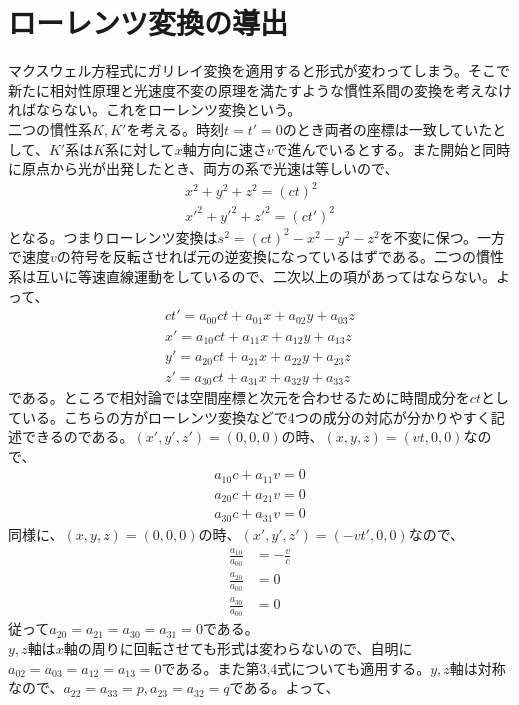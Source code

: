     \section{ローレンツ変換の導出}
        マクスウェル方程式にガリレイ変換を適用すると形式が変わってしまう。そこで新たに相対性原理と光速度不変の原理を満たすような慣性系間の変換を考えなければならない。これをローレンツ変換という。\\
        二つの慣性系$K,K'$を考える。時刻$t=t'=0$のとき両者の座標は一致していたとして、$K'$系は$K$系に対して$x$軸方向に速さ$v$で進んでいるとする。また開始と同時に原点から光が出発したとき、両方の系で光速は等しいので、
        \begin{align*}
            x^2+y^2+z^2 = (ct)^2\\
            x'^2+y'^2+z'^2 = (ct')^2
        \end{align*}
        となる。つまりローレンツ変換は$s^2=(ct)^2-x^2-y^2-z^2$を不変に保つ。一方で速度$v$の符号を反転させれば元の逆変換になっているはずである。二つの慣性系は互いに等速直線運動をしているので、二次以上の項があってはならない。よって、
        \begin{align*}
            ct' = a_{00}ct + a_{01}x + a_{02}y + a_{03}z\\
            x' = a_{10}ct + a_{11}x + a_{12}y + a_{13}z\\
            y' = a_{20}ct + a_{21}x + a_{22}y + a_{23}z\\
            z' = a_{30}ct + a_{31}x + a_{32}y + a_{33}z
        \end{align*}
        である。ところで相対論では空間座標と次元を合わせるために時間成分を$ct$としている。こちらの方がローレンツ変換などで4つの成分の対応が分かりやすく記述できるのである。$(x',y',z')=(0,0,0)の時、(x,y,z)=(vt,0,0)$なので、
        \begin{align*}
            a_{10}c+a_{11}v = 0\\
            a_{20}c+a_{21}v = 0\\
            a_{30}c+a_{31}v = 0
        \end{align*}
        同様に、$(x,y,z)=(0,0,0)の時、(x',y',z')=(-vt',0,0)$なので、
        \begin{align*}
            \frac{a_{10}}{a_{00}} &= -\frac{v}{c}\\
            \frac{a_{20}}{a_{00}} &= 0\\
            \frac{a_{30}}{a_{00}} &= 0
        \end{align*}
        従って$a_{20}=a_{21}=a_{30}=a_{31}=0$である。\\$y,z$軸は$x$軸の周りに回転させても形式は変わらないので、自明に$a_{02}=a_{03}=a_{12}=a_{13}=0$である。また第3,4式についても適用する。$y,z$軸は対称なので、$a_{22}=a_{33}=p,a_{23}=a_{32}=q$である。よって、
